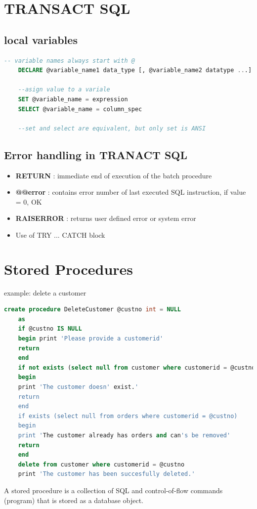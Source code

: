 \documentclass{report}
\begin{document}
	\section{TRANSACT SQL}
	\subsection{local variables}
	\begin{lstlisting}[language = sql]
	-- variable names always start with @
	DECLARE @variable_name1 data_type [, @variable_name2 datatype ...]
	
	--asign value to a variale 
	SET @variable_name = expression
	SELECT @variable_name = column_spec
	
	--set and select are equivalent, but only set is ANSI	\end{lstlisting}
	\subsection{Error handling in TRANACT SQL}
	\begin{itemize}
		\item \textbf{RETURN} : immediate end of execution of the batch procedure
		\item \textbf{@@error} : contains error number of last executed SQL instruction, if value = 0, OK
		\item \textbf{RAISERROR} : returns user defined error or system error 
		\item Use of TRY ...  CATCH block
	\end{itemize}
	\section{Stored Procedures}
	example: delete a customer
	\begin{lstlisting}[language = sql]
	create procedure DeleteCustomer @custno int = NULL
	as
	if @custno IS NULL	
	begin print 'Please provide a customerid'
	return 
	end
	if not exists (select null from customer where customerid = @custno)
	begin
	print 'The customer doesn' exist.'
	return 
	end 
	if exists (select null from orders where customerid = @custno)
	begin 
	print 'The customer already has orders and can's be removed'
	return 
	end
	delete from customer where customerid = @custno
	print 'The customer has been succesfully deleted.'\end{lstlisting}
	A stored procedure is a collection of SQL and control-of-flow commands (program) that is stored as a database object.
\end{document}
